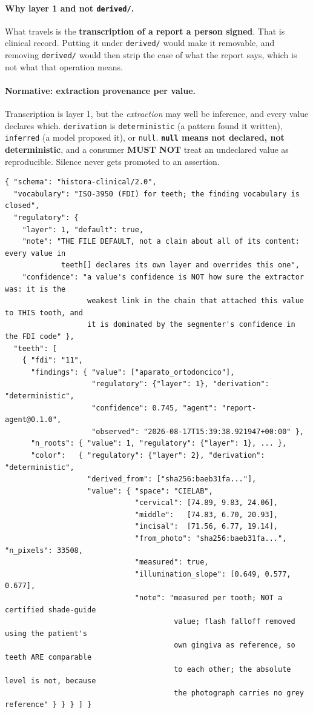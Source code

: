 \documentclass[11pt,a4paper]{article}
\newcommand{\MUSTNOT}{\textcolor{uosred}{\textbf{MUST NOT}}}
\newcommand{\code}[1]{\texttt{\small #1}}
\begin{document}
\paragraph{Why layer 1 and not \code{derived/}.} What travels is the \textbf{transcription
of a report a person signed}. That is clinical record. Putting it under \code{derived/}
would make it removable, and removing \code{derived/} would then strip the case of what the
report says, which is not what that operation means.

\paragraph{Normative: extraction provenance per value.} Transcription is layer 1, but the \emph{extraction} may well be inference, and every value declares which. \code{derivation} is \code{deterministic} (a pattern found it written),
\code{inferred} (a model proposed it), or \code{null}. \textbf{\code{null} means not
declared, not deterministic}, and a consumer \MUSTNOT{} treat an undeclared value as
reproducible. Silence never gets promoted to an assertion.

\newpage
\begin{lstlisting}[style=js]
{ "schema": "histora-clinical/2.0",
  "vocabulary": "ISO-3950 (FDI) for teeth; the finding vocabulary is closed",
  "regulatory": {
    "layer": 1, "default": true,
    "note": "THE FILE DEFAULT, not a claim about all of its content: every value in
             teeth[] declares its own layer and overrides this one",
    "confidence": "a value's confidence is NOT how sure the extractor was: it is the
                   weakest link in the chain that attached this value to THIS tooth, and
                   it is dominated by the segmenter's confidence in the FDI code" },
  "teeth": [
    { "fdi": "11",
      "findings": { "value": ["aparato_ortodoncico"],
                    "regulatory": {"layer": 1}, "derivation": "deterministic",
                    "confidence": 0.745, "agent": "report-agent@0.1.0",
                    "observed": "2026-08-17T15:39:38.921947+00:00" },
      "n_roots": { "value": 1, "regulatory": {"layer": 1}, ... },
      "color":   { "regulatory": {"layer": 2}, "derivation": "deterministic",
                   "derived_from": ["sha256:baeb31fa..."],
                   "value": { "space": "CIELAB",
                              "cervical": [74.89, 9.83, 24.06],
                              "middle":   [74.83, 6.70, 20.93],
                              "incisal":  [71.56, 6.77, 19.14],
                              "from_photo": "sha256:baeb31fa...", "n_pixels": 33508,
                              "measured": true,
                              "illumination_slope": [0.649, 0.577, 0.677],
                              "note": "measured per tooth; NOT a certified shade-guide
                                       value; flash falloff removed using the patient's
                                       own gingiva as reference, so teeth ARE comparable
                                       to each other; the absolute level is not, because
                                       the photograph carries no grey reference" } } } ] }
\end{lstlisting}
\end{document}
